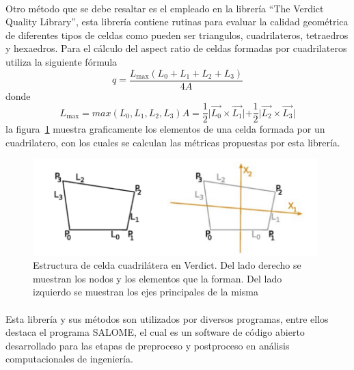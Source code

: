 \documentclass[letterpaper, openright, 12pt]{book}
\begin{document}
    \paragraph*{}
    Otro método que se debe resaltar es el empleado en la librería ``The
    Verdict Quality Library'', esta librería contiene rutinas para evaluar
    la calidad geométrica de diferentes tipos de celdas como pueden ser
    triangulos, cuadrilateros, tetraedros y hexaedros. Para el cálculo del
    aspect ratio de celdas formadas por cuadrilateros utiliza la siguiente
    fórmula
    \begin{equation}
        q = \frac{L_{\max}\left( L_0 + L_1 + L_2 + L_3 \right)}{4A}
    \end{equation}
    donde
    \begin{subequations}
        \begin{equation*}
            L_{\max} = max\left( L_0, L_1, L_2, L_3 \right)
        \end{equation*}
        \begin{equation*}
            A = \frac{1}{2} \lvert \vec{L_0} \times \vec{L_1} \lvert
                + \frac{1}{2} \lvert \vec{L_2} \times \vec{L_3} \lvert
        \end{equation*}
    \end{subequations}
    la figura~\ref{aspect_verdict} muestra graficamente los elementos de una
    celda formada por un cuadrilatero, con los cuales se calculan las métricas
    propuestas por esta librería.

        \begin{figure}[htbp!]
            \centering
            \includegraphics[keepaspectratio, width=110mm]{./Imagenes/aspect_verdict.png}
            \caption[Estrcutura celda cuadrilatera en Verdict]{Estructura de
            celda cuadrilátera en Verdict. Del lado derecho se muestran los
            nodos y los elementos que la forman. Del lado izquierdo se muestran
            los ejes principales de la misma\cite{verdict_quality}}
            \label{aspect_verdict}
        \end{figure}

    \paragraph*{}
    Esta librería y sus métodos son utilizados por diversos programas, entre
    ellos destaca el programa SALOME, el cual es un software de código
    abierto desarrollado para las etapas de preproceso y postproceso en
    análisis computacionales de ingeniería.
\end{document}
